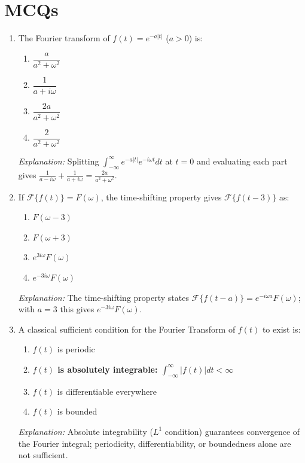 \documentclass[12pt,a4paper]{article}
\begin{document}
\section{MCQs}

\begin{enumerate}[label=\textbf{MCQ \arabic*.}, leftmargin=3em]

\item The Fourier transform of $f(t) = e^{-a|t|}$ ($a > 0$) is:

\begin{enumerate}[label=(\alph*)]
  \item $\dfrac{a}{a^2+\omega^2}$
  \item $\dfrac{1}{a+i\omega}$
  \item \textbf{$\dfrac{2a}{a^2+\omega^2}$}
  \item $\dfrac{2}{a^2+\omega^2}$
\end{enumerate}
\textit{Explanation:} Splitting $\int_{-\infty}^{\infty}e^{-a|t|}e^{-i\omega t}dt$ at $t=0$ and evaluating each part gives $\frac{1}{a-i\omega}+\frac{1}{a+i\omega} = \frac{2a}{a^2+\omega^2}$.

\item If $\mathcal{F}\{f(t)\} = F(\omega)$, the time-shifting property gives $\mathcal{F}\{f(t-3)\}$ as:

\begin{enumerate}[label=(\alph*)]
  \item $F(\omega - 3)$
  \item $F(\omega + 3)$
  \item $e^{3i\omega}F(\omega)$
  \item \textbf{$e^{-3i\omega}F(\omega)$}
\end{enumerate}
\textit{Explanation:} The time-shifting property states $\mathcal{F}\{f(t-a)\} = e^{-i\omega a}F(\omega)$; with $a=3$ this gives $e^{-3i\omega}F(\omega)$.

\item A classical sufficient condition for the Fourier Transform of $f(t)$ to exist is:

\begin{enumerate}[label=(\alph*)]
  \item $f(t)$ is periodic
  \item \textbf{$f(t)$ is absolutely integrable: $\int_{-\infty}^{\infty}|f(t)|dt < \infty$}
  \item $f(t)$ is differentiable everywhere
  \item $f(t)$ is bounded
\end{enumerate}
\textit{Explanation:} Absolute integrability ($L^1$ condition) guarantees convergence of the Fourier integral; periodicity, differentiability, or boundedness alone are not sufficient.


\end{enumerate}
\end{document}
